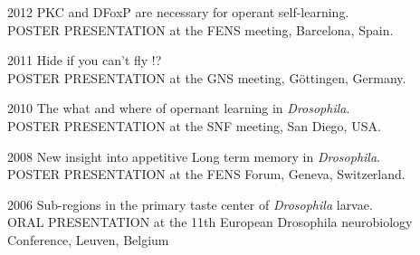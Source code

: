 %
%
%
\begin{itemize}
%
\begin{sloppypar}
\item[2012] PKC and DFoxP are necessary for operant self-learning. 
\\POSTER PRESENTATION at the FENS meeting, Barcelona, Spain.


\item[2011] Hide if you can't fly !?
\\POSTER PRESENTATION at the GNS meeting, G\"{o}ttingen, Germany.

\item[2010] The what and where of opernant learning in \textit{Drosophila}.
\\POSTER PRESENTATION at the SNF meeting, San Diego, USA.
%
\item[2008] New insight into appetitive Long term memory in \textit{Drosophila}.
\\POSTER PRESENTATION at the FENS Forum, Geneva, Switzerland.


\item[2006] Sub-regions in the primary taste center of \textit{Drosophila} larvae.
\\ORAL PRESENTATION at the 11th European Drosophila neurobiology Conference, Leuven, Belgium



%



\end{sloppypar}
\end{itemize}
